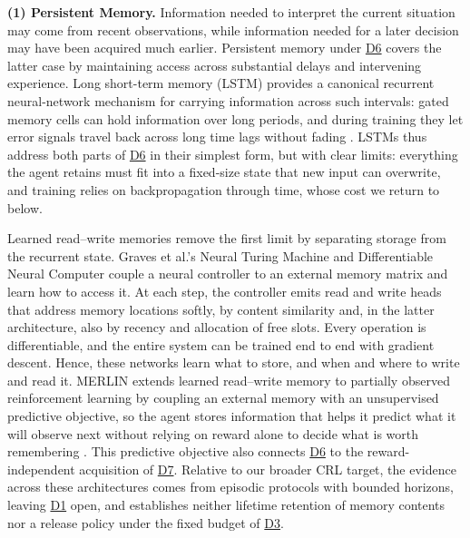 \documentclass[10pt,journal,compsoc]{IEEEtran}
\DeclareRobustCommand{\Dref}[1]{\hyperref[sec:d#1]{D#1}}
\begin{document}
\noindent\textbf{(1) Persistent Memory.}
Information needed to interpret the current situation may come from recent observations, while information needed for a later decision may have been acquired much earlier.
Persistent memory under \Dref{6} covers the latter case by maintaining access across substantial delays and intervening experience.
Long short-term memory (LSTM) provides a canonical recurrent neural-network mechanism for carrying information across such intervals: gated memory cells can hold information over long periods, and during training they let error signals travel back across long time lags without fading \cite{hochreiter1997}.
LSTMs thus address both parts of \Dref{6} in their simplest form, but with clear limits: everything the agent retains must fit into a fixed-size state that new input can overwrite, and training relies on backpropagation through time, whose cost we return to below.

Learned read--write memories remove the first limit by separating storage from the recurrent state.
Graves et al.'s Neural Turing Machine \cite{graves2014} and Differentiable Neural Computer \cite{graves2016b} couple a neural controller to an external memory matrix and learn how to access it.
At each step, the controller emits read and write heads that address memory locations softly, by content similarity and, in the latter architecture, also by recency and allocation of free slots.
Every operation is differentiable, and the entire system can be trained end to end with gradient descent.
Hence, these networks learn what to store, and when and where to write and read it.
MERLIN extends learned read--write memory to partially observed reinforcement learning by coupling an external memory with an unsupervised predictive objective, so the agent stores information that helps it predict what it will observe next without relying on reward alone to decide what is worth remembering \cite{wayne2018}.
This predictive objective also connects \Dref{6} to the reward-independent acquisition of \Dref{7}.
Relative to our broader CRL target, the evidence across these architectures comes from episodic protocols with bounded horizons, leaving \Dref{1} open, and establishes neither lifetime retention of memory contents nor a release policy under the fixed budget of \Dref{3}.
\end{document}
